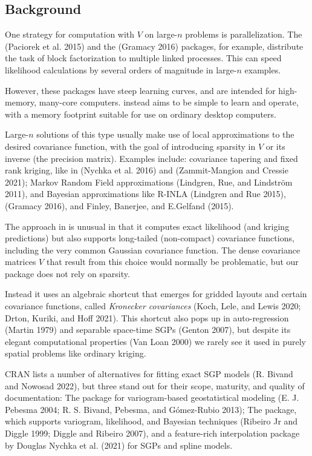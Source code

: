 \hypertarget{background}{%
\subsection{Background}\label{background}}

One strategy for computation with \(V\) on large-\(n\) problems is parallelization. The  (Paciorek et al. 2015) and the  (Gramacy 2016) packages, for example, distribute the task of block factorization to multiple linked processes. This can speed likelihood calculations by several orders of magnitude in large-\(n\) examples.

However, these packages have steep learning curves, and are intended for high-memory, many-core computers.  instead aims to be simple to learn and operate, with a memory footprint suitable for use on ordinary desktop computers.

Large-\(n\) solutions of this type usually make use of local approximations to the desired covariance function, with the goal of introducing sparsity in \(V\) or its inverse (the precision matrix). Examples include: covariance tapering and fixed rank kriging, like in  (Nychka et al. 2016) and  (Zammit-Mangion and Cressie 2021); Markov Random Field approximations (Lindgren, Rue, and Lindström 2011), and Bayesian approximations like R-INLA (Lindgren and Rue 2015),  (Gramacy 2016), and  Finley, Banerjee, and E.Gelfand (2015).

The approach in  is unusual in that it computes exact likelihood (and kriging predictions) but also supports long-tailed (non-compact) covariance functions, including the very common Gaussian covariance function. The dense covariance matrices \(V\) that result from this choice would normally be problematic, but our package does not rely on sparsity.

Instead it uses an algebraic shortcut that emerges for gridded layouts and certain covariance functions, called \emph{Kronecker covariances} (Koch, Lele, and Lewis 2020; Drton, Kuriki, and Hoff 2021). This shortcut also pops up in auto-regression (Martin 1979) and separable space-time SGPs (Genton 2007), but despite its elegant computational properties (Van Loan 2000) we rarely see it used in purely spatial problems like ordinary kriging.

CRAN lists a number of alternatives for fitting exact SGP models (R. Bivand and Nowosad 2022), but three stand out for their scope, maturity, and quality of documentation: The  package for variogram-based geostatistical modeling (E. J. Pebesma 2004; R. S. Bivand, Pebesma, and Gómez-Rubio 2013); The  package, which supports variogram, likelihood, and Bayesian techniques (Ribeiro Jr and Diggle 1999; Diggle and Ribeiro 2007), and  a feature-rich interpolation package by Douglas Nychka et al. (2021) for SGPs and spline models.


